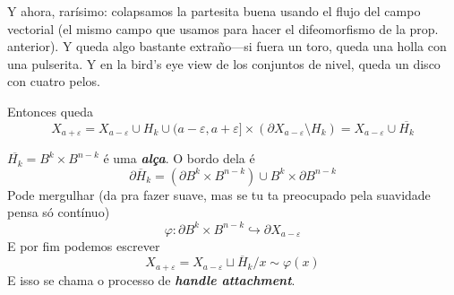 Y ahora, rarísimo: colapsamos la partesita buena usando el flujo del campo vectorial (el mismo campo que usamos para hacer el difeomorfismo de la prop. anterior). Y queda algo bastante extraño---si fuera un toro, queda una holla con una pulserita. Y en la bird's eye view de los conjuntos de nivel, queda un disco con cuatro pelos.

Entonces queda
\[X_{a+ \varepsilon}= X_{a- \varepsilon} \cup  H_k \cup  (a - \varepsilon, a+\varepsilon]\times(\partial X_{a-\varepsilon}\setminus H_k)=X_{a - \varepsilon}\cup \overline{H_k}\]

\(\overline{H_k}=B^k \times B^{n-k}\) é uma \textit{\textbf{alça}}. O bordo dela é
\[\partial \overline{H}_k=(\partial B^k \times B^{n-k}) \cup  B^k \times \partial B^{n-k}\]
Pode mergulhar (da pra fazer suave, mas se tu ta preocupado pela suavidade pensa só contínuo)
\[\varphi: \partial B^k \times B^{n-k}\hookrightarrow \partial X_{a-\varepsilon}\]
E por fim podemos escrever
\[X_{a+\varepsilon}=X_{a-\varepsilon} \sqcup \overline{H}_k \Big/x \sim \varphi(x)\]
E isso se chama o processo de \textit{\textbf{handle attachment}}.



